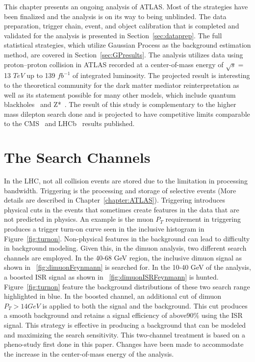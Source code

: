 This chapter presents an ongoing analysis of ATLAS. Most of the strategies have been finalized and the analysis is on its way to being unblinded. The data preparation, trigger chain, event, and object calibration that is completed and validated for the analysis is presented in Section~\ref{sec:dataprep}. The full statistical strategies, which utilize Gaussian Process as the background estimation method, are covered in Section~\ref{sec:GPresults}. The analysis utilizes data using proton--proton collision in ATLAS
recorded at a center-of-mass energy of $\sqrt{s}=$ 13 $TeV$ up to 139 $fb^{-1}$ of integrated luminosity. The projected result is interesting to the theoretical community for the dark matter mediator reinterpretation as well as its statement possible for many other models, which include quantum blackholes~\cite{QBH2008} and Z*~\cite{ZStar2008}. The result of this study is complementary to the higher mass dilepton search done and is projected to have competitive limits comparable to the CMS~\cite{CMS-PAS-EXO-19-018} and LHCb~\cite{Aaij:2722971} results published.

\section{The Search Channels}
In the LHC, not all collision events are stored due to the limitation in processing bandwidth. Triggering is the processing and storage of selective events (More details are described in Chapter~\ref{chapter:ATLAS}). Triggering introduces physical cuts in the events that sometimes create features in the data that are not predicted in physics. An example is the muon $P_{T}$ requirement in triggering produces a trigger turn-on curve seen in the inclusive histogram in Figure~\ref{fig:turnon}.
Non-physical features in the background can lead to difficulty in background modeling. Given this, in the dimuon analysis, two different search channels are employed. In the 40-68 GeV region, the inclusive dimuon signal as shown in ~\ref{fig:dimuonFeynmann} is searched for. In the 10-40 GeV of the analysis, a boosted ISR signal as shown in ~\ref{fig:dimuonISRFeynmann} is hunted. Figure~\ref{fig:turnon} feature the background distributions of these two search range highlighted in blue. In the
boosted channel, an additional cut of dimuon $P_{T}>14 GeV$ is applied to both the signal and the background. This cut produces a smooth background and retains a signal efficiency of above$ 90\%$ using the ISR signal. This strategy is effective in producing a background that can be modeled and maximizing the search sensitivity. 
This two-channel treatment is based on a pheno-study first done in this paper\cite{2014}. Changes have been made to accommodate the increase in the center-of-mass energy of the analysis. 

